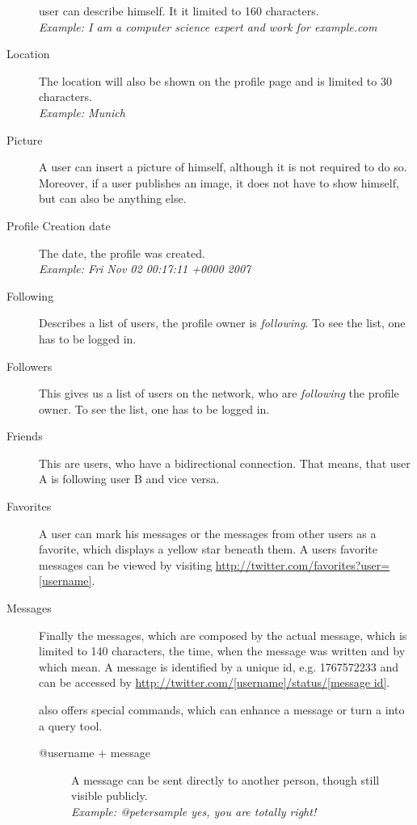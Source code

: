 \begin{description}
                    user can describe himself. It it limited to 160
                    characters.\\
                    \textit{Example: I am a computer science expert and work
                    for example.com}
\item[Location] The location will also be shown on the profile page and is
                limited to 30 characters.\\
                \textit{Example: Munich}
\item[Picture] A user can insert a picture of himself, although it is not
               required to do so. Moreover, if a user publishes an image, it does not have to
               show himself, but can also be anything else.
\item[Profile Creation date] The date, the profile was created.\\
              \textit{Example: Fri Nov 02 00:17:11 +0000 2007}
\item[Following] Describes a list of users, the profile owner is \textit{following}.
                 To see the list, one has to be logged in.
\item[Followers] This gives us a list of users on the \Twitter{} network, who
                 are \textit{following} the profile owner. To see the list, one has to be logged in.
\item[Friends] This are users, who have a bidirectional connection. That means,
               that user A is following user B and vice versa.
\item[Favorites] A user can mark his messages or the messages from other users as
                 a favorite, which displays a
                 yellow star beneath them. A users favorite messages can be viewed
                 by visiting \url{http://twitter.com/favorites?user=[username]}.
\item[Messages] Finally the messages, which are composed by the actual message,
                which is limited to 140 characters, the time, when the message
                was written and by which mean. A message is identified by a unique
                id, e.g. 1767572233 and can be accessed by
                \url{http://twitter.com/[username]/status/[message id]}.

                \Twitter{} also offers special commands, which can enhance a
                message or turn a \Twitter{} into a query tool.
  \begin{description}
    \item[@username + message]
      A message can be sent directly to another person, though still visible
      publicly.\\
      \textit{Example: @petersample yes, you are totally right!}


\end{description}
\end{description}
